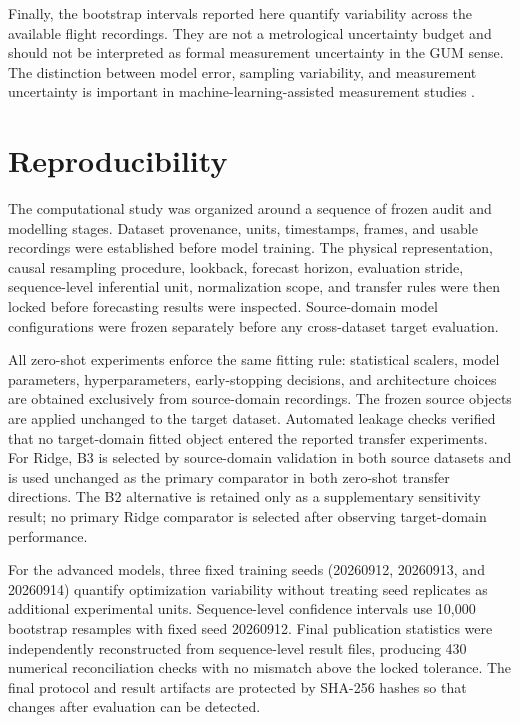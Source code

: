 \documentclass[preprint,12pt]{elsarticle}
\begin{document}
Finally, the bootstrap intervals reported here quantify variability across the available flight recordings. They are not a metrological uncertainty budget and should not be interpreted as formal measurement uncertainty in the GUM sense. The distinction between model error, sampling variability, and measurement uncertainty is important in machine-learning-assisted measurement studies \cite{Huber2025ModelError}.

\section{Reproducibility}
\label{sec:reproducibility}

The computational study was organized around a sequence of frozen audit and modelling stages. Dataset provenance, units, timestamps, frames, and usable recordings were established before model training. The physical representation, causal resampling procedure, lookback, forecast horizon, evaluation stride, sequence-level inferential unit, normalization scope, and transfer rules were then locked before forecasting results were inspected. Source-domain model configurations were frozen separately before any cross-dataset target evaluation.

All zero-shot experiments enforce the same fitting rule: statistical scalers, model parameters, hyperparameters, early-stopping decisions, and architecture choices are obtained exclusively from source-domain recordings. The frozen source objects are applied unchanged to the target dataset. Automated leakage checks verified that no target-domain fitted object entered the reported transfer experiments. For Ridge, B3 is selected by source-domain validation in both source datasets and is used unchanged as the primary comparator in both zero-shot transfer directions. The B2 alternative is retained only as a supplementary sensitivity result; no primary Ridge comparator is selected after observing target-domain performance.

For the advanced models, three fixed training seeds (20260912, 20260913, and 20260914) quantify optimization variability without treating seed replicates as additional experimental units. Sequence-level confidence intervals use 10,000 bootstrap resamples with fixed seed 20260912. Final publication statistics were independently reconstructed from sequence-level result files, producing 430 numerical reconciliation checks with no mismatch above the locked tolerance. The final protocol and result artifacts are protected by SHA-256 hashes so that changes after evaluation can be detected.
\end{document}
